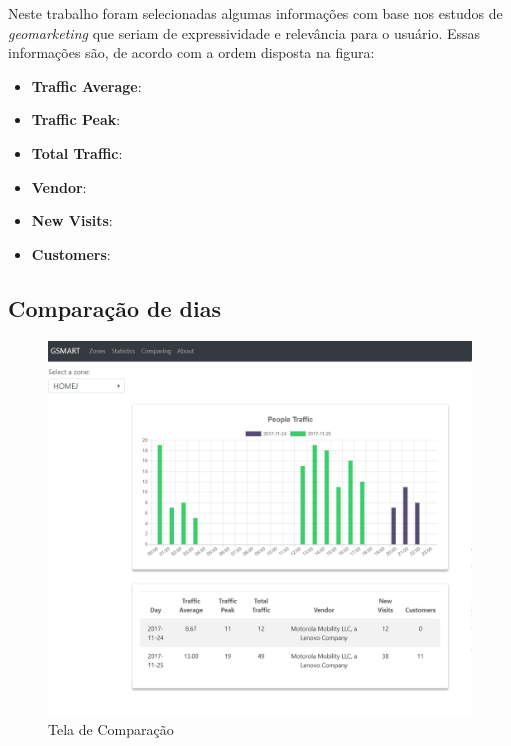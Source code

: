 Neste trabalho foram selecionadas algumas informações com base nos estudos de \emph{geomarketing} que seriam
de expressividade e relevância para o usuário. Essas informações são, de acordo com a ordem disposta
na figura:

\begin{itemize}
    \item \textbf{Traffic Average}:
    \item \textbf{Traffic Peak}:
    \item \textbf{Total Traffic}:
    \item \textbf{Vendor}:
    \item \textbf{New Visits}:
    \item \textbf{Customers}:
\end{itemize}

\subsection{Comparação de dias}

\begin{figure}[!h]
  \caption{\label{comparing-ap}Tela de Comparação}
  \begin{center}
    \includegraphics[width=1.0\textwidth]{img/comparing.png}
  \end{center}
\end{figure}
